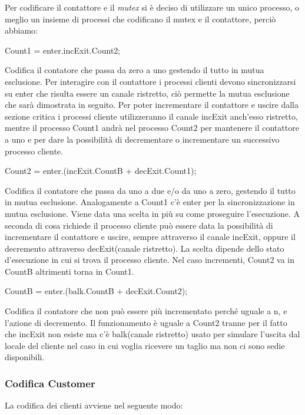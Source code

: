 Per codificare il contattore e il \textsl{mutex} si è deciso di utilizzare un unico processo, o meglio un insieme di processi che codificano il \textsf{mutex} e il contattore, perciò abbiamo: 

\textsf{Count1 = enter.incExit.Count2;}

Codifica il contatore che passa da zero a uno gestendo il tutto in mutua esclusione. Per interagire con il contattore i processi clienti devono sincronizzarsi su \textsf{enter} che risulta essere un canale ristretto, ciò permette la mutua esclusione che sarà dimostrata in seguito. Per poter incrementare il contattore e uscire dalla sezione critica i processi cliente utilizzeranno il canale \textsf{incExit} anch'esso ristretto, mentre il processo \textsf{Count1} andrà nel processo \textsf{Count2} per mantenere il contattore a uno e per dare la possibilità di decrementare o incrementare un successivo processo cliente.

\textsf{Count2 = enter.(incExit.CountB + decExit.Count1);}

Codifica il contatore che passa da uno a due e/o da uno a zero, gestendo il tutto in mutua esclusione. Analogamente a \textsf{Count1} c'è \textsf{enter} per la sincronizzazione in mutua esclusione. Viene data una scelta in più su come proseguire l'esecuzione. A seconda di cosa richiede il processo cliente può essere data la possibilità di incrementare il contattore e uscire, sempre attraverso il canale \textsf{incExit}, oppure il decremento attraverso \textsf{decExit}(canale ristretto). La scelta dipende dello stato d'esecuzione in cui si trova il processo cliente. Nel caso incrementi, \textsf{Count2} va in \textsf{CountB} altrimenti torna in \textsf{Count1}.

\textsf{CountB = enter.(balk.CountB + decExit.Count2);}

Codifica il contatore che non può essere più incrementato perché uguale a n, e l'azione di decremento. Il funzionamento è uguale a \textsf{Count2} tranne per il fatto che \textsf{incExit} non esiste ma c'è \textsf{balk}(canale ristretto) usato per simulare l'uscita dal locale del cliente nel caso in cui voglia ricevere un taglio ma non ci sono sedie disponibili.

\subsubsection{Codifica Customer}

La codifica dei clienti avviene nel seguente modo:

